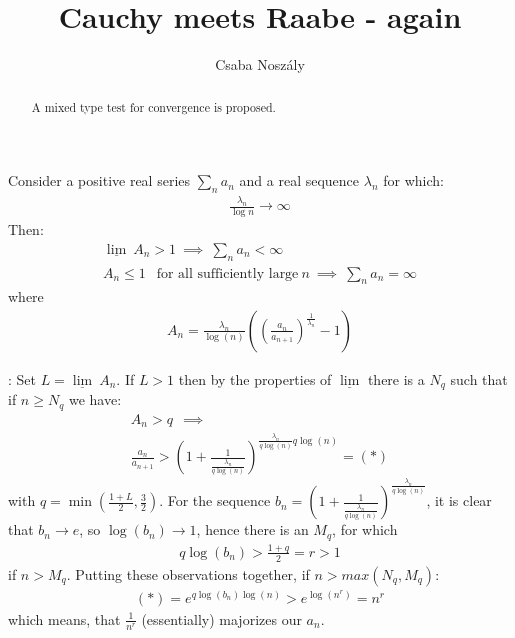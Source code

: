 \documentclass{article}
\author{Csaba Noszály}
\title{Cauchy meets Raabe - again}
\begin{document}
\maketitle

\begin{abstract}
	A mixed type test for convergence is proposed. 
\end{abstract}


\vspace{0.2cm}
\newline
\noindent Consider a positive real series $\sum_n a_n$ and a real sequence $\lambda_n$ for which:
\begin{gather*}
\frac{\lambda_n}{\log{n}}\to \infty
\end{gather*}
Then:
\begin{gather*}
{\underline{\lim}}~ A_n >1 \ \implies \ \sum_n a_n< \infty \\
A_n \le 1 \ \ \text{ for all sufficiently large} \ n \ \implies \ \sum_n a_n= \infty
\end{gather*}
where
\begin{gather*}
A_n= \frac{\lambda_n}{\log(n)}\left( \left(\frac{a_n}{a_{n+1}}\right)^{\frac{1}{\lambda_n}}-1\right)
\end{gather*}


\vspace{0.2cm}
: 
\newline Set $L={\underline{\lim}}~ A_n$. 
\newline If $L>1$ then by the properties of $\underline{\lim}$ there is a $N_q$ such that if $n\ge N_q$ we have:
\begin{gather*}
	A_n > q\ \ \implies \\
    \frac{a_n}{a_{n+1}}>\left( 1 + \frac{1}{\frac{\lambda_n}{q\log(n)}}\right)^{\frac{\lambda_n}{q\log(n)} q\log(n)}=(*)
\end{gather*}
with $q=\min(\frac{1+L}{2},\frac{3}{2})$. For the sequence $b_n=\left( 1 + \frac{1}{\frac{\lambda_n}{q\log(n)}}\right)^{\frac{\lambda_n}{q\log(n)}}$, it is clear 
	that $b_n \to e$, so $\log(b_n)\to 1$, hence there is an $M_q$, for which
\begin{gather*}
	q\log(b_n) > \frac{1+q}{2}=r>1
\end{gather*}
if $n>M_q$. Putting these observations together, if $n>max(N_q,M_q)$:
\begin{gather*}
(*)=e^{q\log(b_n) \log(n)} > e^{\log(n^r)}=n^r
\end{gather*}
which means, that $\frac{1}{n^r}$ (essentially) majorizes our $a_n$.
\end{document}
